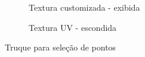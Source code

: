 \documentclass[10pt,a4paper]{article}
\begin{document}
\begin{figure}[h!]
\centering
\begin{subfigure}{0.4\linewidth}
\caption{Textura customizada - exibida}
\end{subfigure}
\begin{subfigure}{0.4\linewidth}
\caption{Textura UV - escondida}
\end{subfigure}
\caption{Truque para seleção de pontos}
\label{tracing}
\end{figure}
\end{document}
